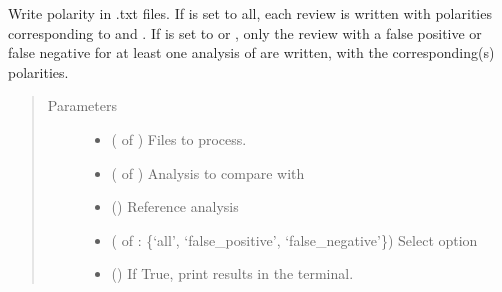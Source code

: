\documentclass[letterpaper,10pt,english]{sphinxmanual}
\begin{document}
\begin{fulllineitems}
\label{\detokenize{analysis:loacore.analysis.polarity_check.write_polarity_check}}
Write polarity in .txt files. If  is set to all, each review is written with polarities corresponding to
 and . If  is set to  or , only the review with a
false positive or false negative for at least one analysis of  are written, with the
corresponding(s) polarities.
\begin{quote}\begin{description}
\item[{Parameters}] \leavevmode\begin{itemize}
\item {} 
 ( of {\hyperref[\detokenize{classes:loacore.classes.classes.File}]{}}) \textendash{} Files to process.

\item {} 
 ( of ) \textendash{} Analysis to compare with 

\item {} 
 () \textendash{} Reference analysis

\item {} 
 ( of  : \{‘all’, ‘false\_positive’, ‘false\_negative’\}) \textendash{} Select option

\item {} 
 () \textendash{} If True, print results in the terminal.


\end{itemize}
\end{description}
\end{quote}
\end{fulllineitems}
\end{document}
